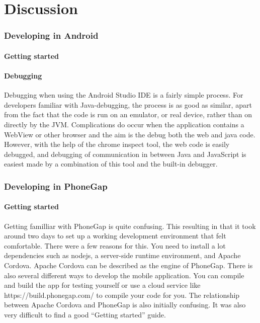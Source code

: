 
\chapter{Discussion}
\subsection{Developing in Android}
\subsubsection{Getting started}
\subsubsection{Debugging}
Debugging when using the Android Studio IDE is a fairly simple process. For developers familiar with Java-debugging, the process is as good as similar, apart from the fact that the code is run on an emulator, or real device, rather than on directly by the JVM. Complications do occur when the application contains a WebView or other browser and the aim is the debug both the web and java code. However, with the help of the chrome inspect tool, the web code is easily debugged, and debugging of communication in between Java and JavaScript is easiest made by a combination of this tool and the built-in debugger. 
\subsection{Developing in PhoneGap}
\subsubsection{Getting started}
Getting familliar with PhoneGap is quite confusing. This resulting in that it took around two days to set up a working development environment that felt comfortable. There were a few reasons for this. You need to install a lot dependencies such as nodejs, a server-side runtime environment, and Apache Cordova. Apache Cordova can be described as the engine of PhoneGap. There is also several different ways to develop the mobile application. You can compile and build the app for testing yourself or use a cloud service like https://build.phonegap.com/ to compile your code for you. The relationship between Apache Cordova and PhoneGap is also initially confusing. It was also very difficult to find a good “Getting started” guide.

